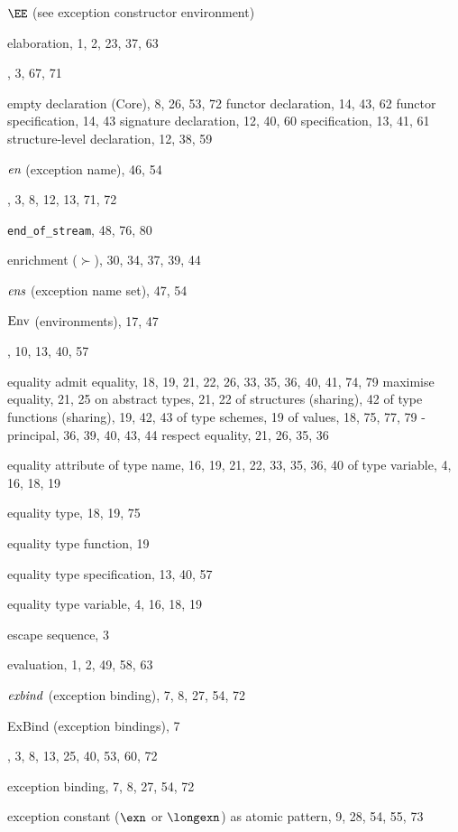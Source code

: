 \begin{theindex}
\item $\EE$ (see exception constructor environment) 
\item elaboration, 1, 2, 23, 37, 63
\item \ELSE, 3, 67, 71
\item empty 
\subitem declaration (Core), 8, 26, 53, 72
\subitem functor declaration, 14, 43, 62
\subitem functor specification, 14, 43
\subitem signature declaration, 12, 40, 60
\subitem specification, 13, 41, 61
\subitem structure-level declaration, 12, 38, 59
\item $\mbox{\it en}$ (exception name), 46, 54
\item \END, 3, 8, 12, 13, 71, 72
\item \verb+end_of_stream+, 48, 76, 80
\item enrichment ($\succ$), 30, 34, 37, 39, 44
\item $\mbox{\it ens}$ (exception name set), 47, 54
\item ${\rm Env}$ (environments), 17, 47
\item \EQTYPE, 10, 13, 40, 57
\item equality 
\subitem admit equality, 18, 19, 21, 22, 26, 33, 35, 36, 40, 41, 74, 79
\subitem maximise equality, 21, 25
\subitem on abstract types, 21, 22
\subitem of structures (sharing), 42
\subitem of type functions (sharing), 19, 42, 43
\subitem of type schemes, 19
\subitem of values, 18, 75, 77, 79
\subitem -principal, 36, 39, 40, 43, 44
\subitem respect equality, 21, 26, 35, 36
\item equality attribute 
\subitem of type name, 16, 19, 21, 22, 33, 35, 36, 40
\subitem of type variable, 4, 16, 18, 19
\item equality type, 18, 19, 75
\item equality type function, 19
\item equality type specification, 13, 40, 57
\item equality type variable, 4, 16, 18, 19
\item escape sequence, 3
\item evaluation, 1, 2, 49, 58, 63
\item ${\it exbind}$ (exception binding), 7, 8, 27, 54, 72
\item ExBind (exception bindings), 7
\item \EXCEPTION, 3, 8, 13, 25, 40, 53, 60, 72
\item exception binding, 7, 8, 27, 54, 72
\item exception constant ($\exn$ or $\longexn$) 
\subitem as atomic pattern, 9, 28, 54, 55, 73

\end{theindex}
